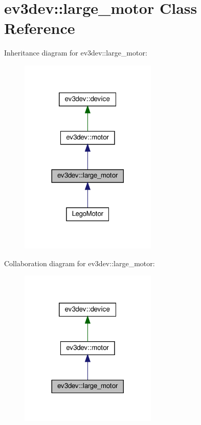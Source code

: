 \hypertarget{classev3dev_1_1large__motor}{}\section{ev3dev\+:\+:large\+\_\+motor Class Reference}
\label{classev3dev_1_1large__motor}


Inheritance diagram for ev3dev\+:\+:large\+\_\+motor\+:
\nopagebreak
\begin{figure}[H]
\begin{center}
\leavevmode
\includegraphics[width=185pt]{classev3dev_1_1large__motor__inherit__graph}
\end{center}
\end{figure}


Collaboration diagram for ev3dev\+:\+:large\+\_\+motor\+:
\nopagebreak
\begin{figure}[H]
\begin{center}
\leavevmode
\includegraphics[width=185pt]{classev3dev_1_1large__motor__coll__graph}
\end{center}
\end{figure}
